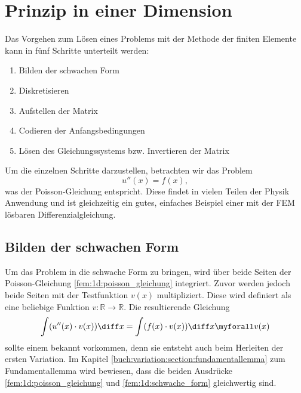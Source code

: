 %
%
%
%
\section{Prinzip in einer Dimension\label{fem:1d}}

Das Vorgehen zum Lösen eines Problems mit der Methode der finiten Elemente kann in fünf Schritte unterteilt werden:
\begin{enumerate}
    \item Bilden der schwachen Form
    \item Diskretisieren
    \item Aufstellen der Matrix
    \item Codieren der Anfangsbedingungen
    \item Lösen des Gleichungssystems bzw. Invertieren der Matrix
\end{enumerate}

Um die einzelnen Schritte darzustellen, betrachten wir das Problem
\begin{equation}
    u''(x) = f(x)
    \label{fem:1d:poisson_gleichung},
\end{equation}
was der Poisson-Gleichung entspricht. 
Diese findet in vielen Teilen der Physik Anwendung und ist gleichzeitig ein gutes, einfaches Beispiel einer mit der FEM lösbaren Differenzialgleichung.


\subsection{Bilden der schwachen Form}
Um das Problem in die schwache Form zu bringen, wird über beide Seiten der Poisson-Gleichung \ref{fem:1d:poisson_gleichung} integriert.
Zuvor werden jedoch beide Seiten mit der Testfunktion $ v(x) $ multipliziert.
Diese wird definiert als eine beliebige Funktion $ v \colon \mathbb{R} \rightarrow \mathbb{R} $.
Die resultierende Gleichung
\begin{equation}
    \int(u''(x) \cdot v(x)) \diff x = \int(f(x) \cdot v(x)) \diff x \myforall v(x)
    \label{fem:1d:schwache_form}
\end{equation}
sollte einem bekannt vorkommen, denn sie entsteht auch beim Herleiten der ersten Variation.
Im Kapitel \ref{buch:variation:section:fundamentallemma} zum Fundamentallemma wird bewiesen, dass die beiden Ausdrücke \ref{fem:1d:poisson_gleichung} und \ref{fem:1d:schwache_form} gleichwertig sind.

